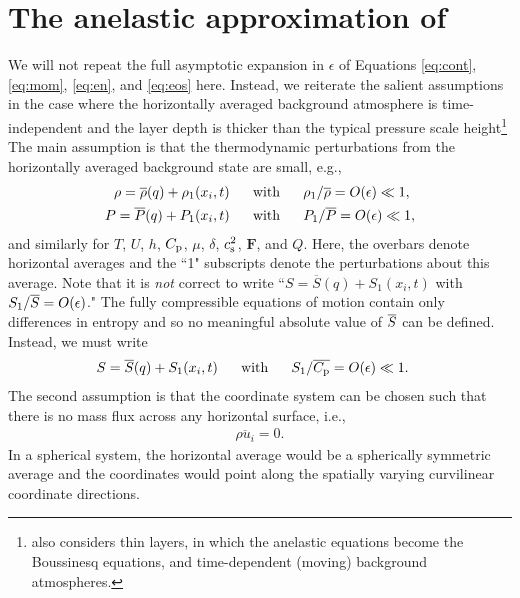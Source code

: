 \documentclass[12pt]{article}
\newcommand{\vecf}{\bm{F}}
\newcommand{\cpref}{\overline{\cpcap}}
\begin{document}
	\section{The anelastic approximation of \citet{Gough1969}}
	We will not repeat the full asymptotic expansion in $\epsilon$ of Equations \eqref{eq:cont}, \eqref{eq:mom}, \eqref{eq:en}, and \eqref{eq:eos} here. Instead, we reiterate the salient assumptions in the case where the horizontally averaged background atmosphere is time-independent and the layer depth is thicker than the typical pressure scale height\footnote{\citet{Gough1969} also considers thin layers, in which the anelastic equations become the Boussinesq equations, and time-dependent (moving) background atmospheres.} The main assumption is that the thermodynamic perturbations from the horizontally averaged background state are small, e.g.,
	\begin{align}\label{eq:linearthermo}
		\rho = \overline{\rho}(q) + \rho_1(x_i,t)\ \ \ \ \  &\text{with}\ \ \ \ \  \rho_1/\overline{\rho}=O(\epsilon)\ll 1,\\
		P = \overline{P}(q) + P_1(x_i,t)\ \ \ \ \  &\text{with}\ \ \ \ \  P_1/\overline{P}=O(\epsilon)\ll1 \nonumber,
	\end{align} 
	and similarly for $T$, $U$, $h$, $C_{\rm{p}}$, $\mu$, $\delta$, $c_{\rm s}^2$, $\vecf$, and $Q$. Here, the overbars denote horizontal averages and the ``1" subscripts denote the perturbations about this average. Note that it is \textit{not} correct to write ``$S=\overline{S}(q)+S_1(x_i,t)$ with $S_1/\overline{S}=O(\epsilon)$." The fully compressible equations of motion contain only differences in entropy and so no meaningful absolute value of $\overline{S}$ can be defined. Instead, we must write
	\begin{align}\label{eq:linearent}
	S = \sref(q) + S_1(x_i,t) \five &\with S_1/\cpref=O(\epsilon)\ll 1.
	\end{align} 
	The second assumption is that the coordinate system can be chosen such that there is no mass flux across any horizontal surface, i.e.,
	\begin{align}\label{eq:nomassflux}
		\overline{\rho u_i}=0.
	\end{align}
	In a spherical system, the horizontal average would be a spherically symmetric average and the coordinates would point along the spatially varying curvilinear coordinate directions. 
	
\end{document}
